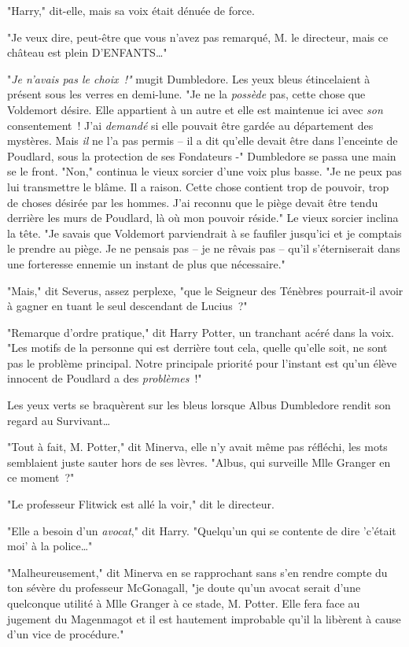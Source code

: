 "Harry," dit-elle, mais sa voix était dénuée de force.

"Je veux dire, peut-être que vous n'avez pas remarqué, M. le directeur, mais ce château est plein D'ENFANTS…"

"\emph{Je n'avais pas le choix~!"} mugit Dumbledore. Les yeux bleus étincelaient à présent sous les verres en demi-lune. "Je ne la \emph{possède} pas, cette chose que Voldemort désire. Elle appartient à un autre et elle est maintenue ici avec \emph{son} consentement~! J'ai \emph{demandé} si elle pouvait être gardée au département des mystères. Mais \emph{il} ne l'a pas permis -- il a dit qu'elle devait être dans l'enceinte de Poudlard, sous la protection de ses Fondateurs -" Dumbledore se passa une main se le front. "Non," continua le vieux sorcier d'une voix plus basse. "Je ne peux pas lui transmettre le blâme. Il a raison. Cette chose contient trop de pouvoir, trop de choses désirée par les hommes. J'ai reconnu que le piège devait être tendu derrière les murs de Poudlard, là où mon pouvoir réside." Le vieux sorcier inclina la tête. "Je savais que Voldemort parviendrait à se faufiler jusqu'ici et je comptais le prendre au piège. Je ne pensais pas -- je ne rêvais pas -- qu'il s'éterniserait dans une forteresse ennemie un instant de plus que nécessaire."

"Mais," dit Severus, assez perplexe, "que le Seigneur des Ténèbres pourrait-il avoir à gagner en tuant le seul descendant de Lucius~?"

"Remarque d'ordre pratique," dit Harry Potter, un tranchant acéré dans la voix. "Les motifs de la personne qui est derrière tout cela, quelle qu'elle soit, ne sont pas le problème principal. Notre principale priorité pour l'instant est qu'un élève innocent de Poudlard a des \emph{problèmes}~!"

Les yeux verts se braquèrent sur les bleus lorsque Albus Dumbledore rendit son regard au Survivant…

"Tout à fait, M. Potter," dit Minerva, elle n'y avait même pas réfléchi, les mots semblaient juste sauter hors de ses lèvres. "Albus, qui surveille Mlle Granger en ce moment~?"

"Le professeur Flitwick est allé la voir," dit le directeur.

"Elle a besoin d'un \emph{avocat}," dit Harry. "Quelqu'un qui se contente de dire 'c'était moi' à la police…"

"Malheureusement," dit Minerva en se rapprochant sans s'en rendre compte du ton sévère du professeur McGonagall, "je doute qu'un avocat serait d'une quelconque utilité à Mlle Granger à ce stade, M. Potter. Elle fera face au jugement du Magenmagot et il est hautement improbable qu'il la libèrent à cause d'un vice de procédure."

